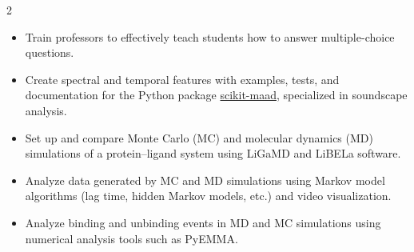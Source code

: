 \documentclass[10pt,legalpaper,ragged2e,withhyper]{altacv}
\begin{document}
\begin{paracol}{2}
\begin{itemize}
	\item Train professors to effectively teach students how to answer multiple-choice questions.
\end{itemize}
\divider



{}
\begin{itemize}
	\item Create spectral and temporal features with examples, tests, and documentation for the Python package \textcolor{teal}{\href{https://scikit-maad.github.io/}{scikit-maad}}, specialized in soundscape analysis.
\end{itemize}


\vspace{10pt}


\begin{itemize}
\item Set up and compare Monte Carlo (MC) and molecular dynamics (MD) simulations of a protein–ligand system using LiGaMD and LiBELa software.

\item Analyze data generated by MC and MD simulations using Markov model algorithms (lag time, hidden Markov models, etc.) and video visualization.

\item Analyze binding and unbinding events in MD and MC simulations using numerical analysis tools such as PyEMMA.

\end{itemize}



\end{paracol}
\end{document}
